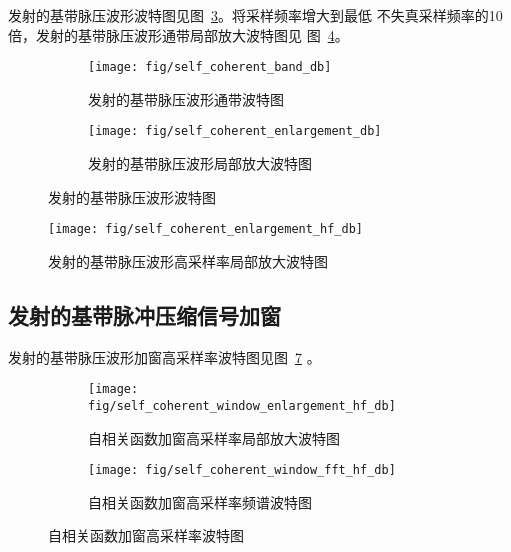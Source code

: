 \documentclass[../main]{subfiles}
\begin{document}
发射的基带脉压波形波特图见图~\ref{fig:self_coherent_db}。将采样频率增大到最低
不失真采样频率的10倍，发射的基带脉压波形通带局部放大波特图见
图~\ref{fig:self_coherent_enlargement_hf_db}。

\begin{figure}[htbp]
  \centering
  \begin{subfigure}[htbp]{0.45\linewidth}
    \centering
    \texttt{[image: fig/self\_coherent\_band\_db]}
    \caption{发射的基带脉压波形通带波特图}%
    \label{fig:self_coherent_band_db}
  \end{subfigure}
  \quad
  \begin{subfigure}[htbp]{0.45\linewidth}
    \centering
    \texttt{[image: fig/self\_coherent\_enlargement\_db]}
    \caption{发射的基带脉压波形局部放大波特图}%
    \label{fig:self_coherent_enlargement_db}
  \end{subfigure}
  \caption{发射的基带脉压波形波特图}%
  \label{fig:self_coherent_db}
\end{figure}

\begin{figure}[htbp]
  \centering
  \texttt{[image: fig/self\_coherent\_enlargement\_hf\_db]}
  \caption{发射的基带脉压波形高采样率局部放大波特图}%
  \label{fig:self_coherent_enlargement_hf_db}
\end{figure}

\subsection{发射的基带脉冲压缩信号加窗}%
\label{sub:self_coherent_window}

发射的基带脉压波形加窗高采样率波特图见图~\ref{fig:self_coherent_window_hf_db}
。

\begin{figure}[htbp]
  \centering
  \begin{subfigure}[htbp]{0.45\linewidth}
    \centering
    \texttt{[image: fig/self\_coherent\_window\_enlargement\_hf\_db]}
    \caption{自相关函数加窗高采样率局部放大波特图}%
    \label{fig:self_coherent_window_enlargement_hf_db}
  \end{subfigure}
  \quad
  \begin{subfigure}[htbp]{0.45\linewidth}
    \centering
    \texttt{[image: fig/self\_coherent\_window\_fft\_hf\_db]}
    \caption{自相关函数加窗高采样率频谱波特图}%
    \label{fig:self_coherent_window_fft_hf_db}
  \end{subfigure}
  \caption{自相关函数加窗高采样率波特图}%
  \label{fig:self_coherent_window_hf_db}
\end{figure}
\end{document}
